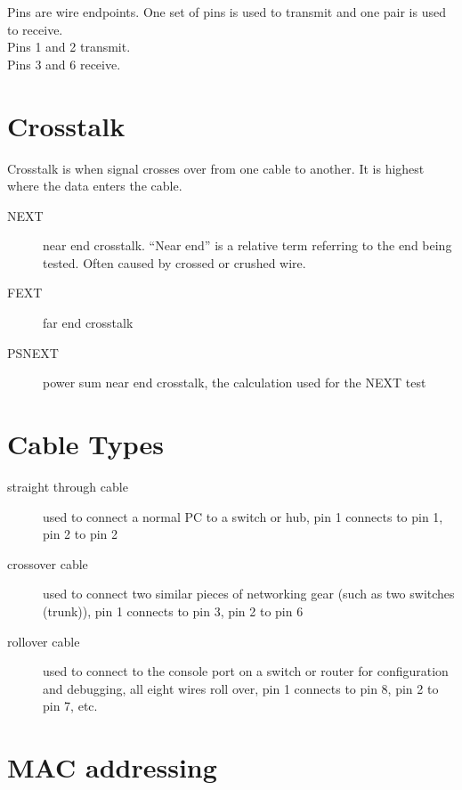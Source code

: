 \documentclass{article}
\begin{document}
Pins are wire endpoints. One set of pins is used to transmit and one pair
is used to receive.\\

Pins 1 and 2 transmit.\\

Pins 3 and 6 receive.

\section{Crosstalk}

Crosstalk is when signal crosses over from one cable to another. It is highest
where the data enters the cable.

\begin{description}

\item[NEXT]
near end crosstalk. ``Near end'' is a relative term referring to the end being
tested. Often caused by crossed or crushed wire.

\item[FEXT]
far end crosstalk

\item[PSNEXT]
power sum near end crosstalk, the calculation used for the NEXT test

\end{description}

\section{Cable Types}

\begin{description}

\item[straight through cable]
used to connect a normal PC to a switch or hub, pin 1 connects to pin 1, pin 2
to pin 2

\item[crossover cable]
used to connect two similar pieces of networking gear (such as two switches
(trunk)), pin 1 connects to pin 3, pin 2 to pin 6

\item[rollover cable]
used to connect to the console port on a switch or router for configuration and
debugging, all eight wires roll over, pin 1 connects to pin 8, pin 2 to pin 7,
etc.

\end{description}

\section{MAC addressing}
\end{document}

